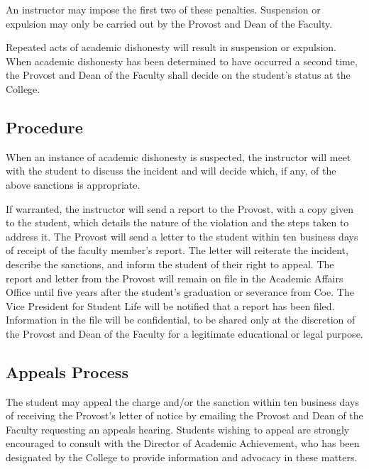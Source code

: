 \documentclass[
  letterpaper,
]{scrbook}
\begin{document}
An instructor may impose the first two of these penalties. Suspension or
expulsion may only be carried out by the Provost and Dean of the
Faculty.

Repeated acts of academic dishonesty will result in suspension or
expulsion. When academic dishonesty has been determined to have occurred
a second time, the Provost and Dean of the Faculty shall decide on the
student's status at the College.

\subsection{Procedure}\label{procedure}

When an instance of academic dishonesty is suspected, the instructor
will meet with the student to discuss the incident and will decide
which, if any, of the above sanctions is appropriate.

If warranted, the instructor will send a report to the Provost, with a
copy given to the student, which details the nature of the violation and
the steps taken to address it. The Provost will send a letter to the
student within ten business days of receipt of the faculty member's
report. The letter will reiterate the incident, describe the sanctions,
and inform the student of their right to appeal. The report and letter
from the Provost will remain on file in the Academic Affairs Office
until five years after the student's graduation or severance from Coe.
The Vice President for Student Life will be notified that a report has
been filed. Information in the file will be confidential, to be shared
only at the discretion of the Provost and Dean of the Faculty for a
legitimate educational or legal purpose.

\subsection{Appeals Process}\label{appeals-process}

The student may appeal the charge and/or the sanction within ten
business days of receiving the Provost's letter of notice by emailing
the Provost and Dean of the Faculty requesting an appeals hearing.
Students wishing to appeal are strongly encouraged to consult with the
Director of Academic Achievement, who has been designated by the College
to provide information and advocacy in these matters.
\end{document}
